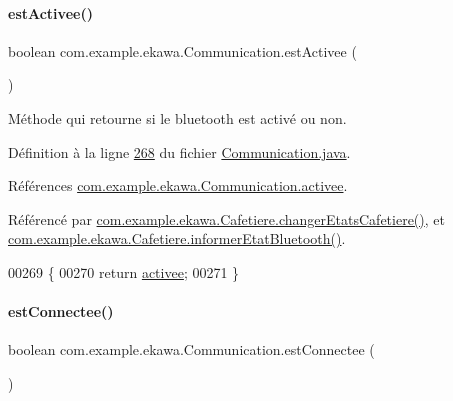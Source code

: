 \paragraph{\texorpdfstring{est\+Activee()}{estActivee()}}
{\footnotesize\ttfamily boolean com.\+example.\+ekawa.\+Communication.\+est\+Activee (\begin{DoxyParamCaption}{ }\end{DoxyParamCaption})}



Méthode qui retourne si le bluetooth est activé ou non. 



Définition à la ligne \hyperlink{_communication_8java_source_l00268}{268} du fichier \hyperlink{_communication_8java_source}{Communication.\+java}.



Références \hyperlink{_communication_8java_source_l00042}{com.\+example.\+ekawa.\+Communication.\+activee}.



Référencé par \hyperlink{_cafetiere_8java_source_l00636}{com.\+example.\+ekawa.\+Cafetiere.\+changer\+Etats\+Cafetiere()}, et \hyperlink{_cafetiere_8java_source_l00265}{com.\+example.\+ekawa.\+Cafetiere.\+informer\+Etat\+Bluetooth()}.


\begin{DoxyCode}
00269     \{
00270         \textcolor{keywordflow}{return} \hyperlink{classcom_1_1example_1_1ekawa_1_1_communication_a2f49177a9865ed41a759bce83658bb6e}{activee};
00271     \}
\end{DoxyCode}
\mbox{\label{classcom_1_1example_1_1ekawa_1_1_communication_a0c591a578528edaa5bb665cede5738bc}} 
\paragraph{\texorpdfstring{est\+Connectee()}{estConnectee()}}
{\footnotesize\ttfamily boolean com.\+example.\+ekawa.\+Communication.\+est\+Connectee (\begin{DoxyParamCaption}{ }\end{DoxyParamCaption})}



